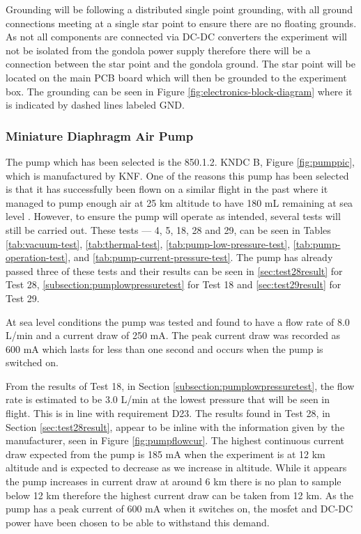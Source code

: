 Grounding will be following a distributed single point grounding, with all ground connections meeting at a single star point to ensure there are no floating grounds. As not all components are connected via DC-DC converters the experiment will not be isolated from the gondola power supply therefore there will be a connection between the star point and the gondola ground. The star point will be located on the main PCB board which will then be grounded to the experiment box. The grounding can be seen in Figure \ref{fig:electronics-block-diagram} where it is indicated by dashed lines labeled GND. 

\subsubsection{Miniature Diaphragm Air Pump}
The pump which has been selected is the 850.1.2. KNDC B, Figure \ref{fig:pumppic}, which is manufactured by KNF. One of the reasons this pump has been selected is that it has successfully been flown on a similar flight in the past where it managed to pump enough air at 25 km altitude to have 180 mL remaining at sea level \cite{LISA}. However, to ensure the pump will operate as intended, several tests will still be carried out. These tests --- 4, 5, 18, 28 and 29, can be seen in Tables \ref{tab:vacuum-test}, \ref{tab:thermal-test}, \ref{tab:pump-low-pressure-test}, \ref{tab:pump-operation-test}, and \ref{tab:pump-current-pressure-test}. The pump has already passed three of these tests and their results can be seen in \ref{sec:test28result} for Test 28, \ref{subsection:pumplowpressuretest} for Test 18 and \ref{sec:test29result} for Test 29.

At sea level conditions the pump was tested and found to have a flow rate of 8.0 L/min and a current draw of 250 mA. The peak current draw was recorded as 600 mA which lasts for less than one second and occurs when the pump is switched on. 

From the results of Test 18, in Section \ref{subsection:pumplowpressuretest}, the flow rate is estimated to be 3.0 L/min at the lowest pressure that will be seen in flight. This is in line with requirement D23. The results found in Test 28, in Section \ref{sec:test28result}, appear to be inline with the information given by the manufacturer, seen in Figure \ref{fig:pumpflowcur}.  The highest continuous current draw expected from the pump is 185 mA when the experiment is at 12 km altitude and is expected to decrease as we increase in altitude. While it appears the pump increases in current draw at around 6 km there is no plan to sample below 12 km therefore the highest current draw can be taken from 12 km. As the pump has a peak current of 600 mA when it switches on, the mosfet and DC-DC power have been chosen to be able to withstand this demand. 


